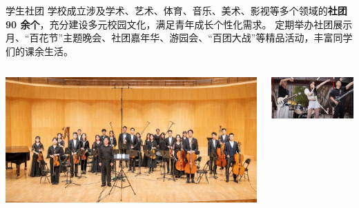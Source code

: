 \documentclass[aspectratio=169, utf8, fontset=windows]{beamer}
\begin{document}
\begin{frame}{学生社团}
    学校成立涉及学术、艺术、体育、音乐、美术、影视等多个领域的\textcolor{Fore}{\textbf{社团 90 余个}}，充分建设多元校园文化，满足青年成长个性化需求。
    定期举办社团展示月、“百花节”主题晚会、社团嘉年华、游园会、“百团大战”等精品活动，丰富同学们的课余生活。\\[1em]

    \begin{columns}
        \includegraphics[width=\textwidth]{./resources/25.jpg}

        \includegraphics[width=\textwidth]{./resources/26.jpg}
    \end{columns}
\end{frame}
\end{document}
